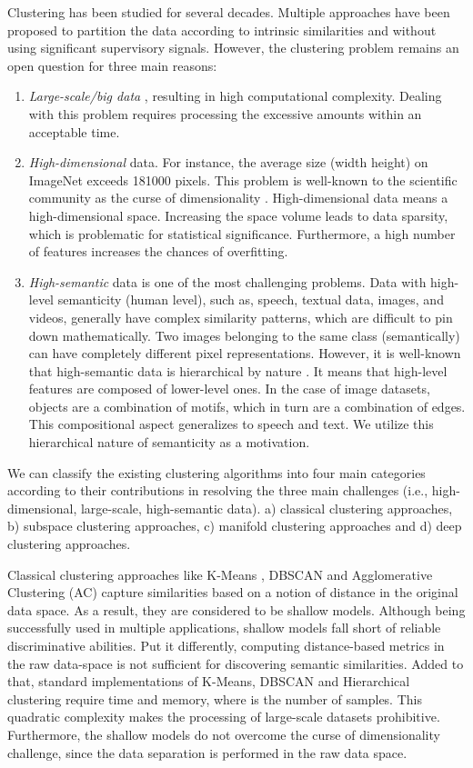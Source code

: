\documentclass{article}
\begin{document}
Clustering has been studied for several decades. Multiple approaches have been proposed to partition the data according to intrinsic similarities and without using significant supervisory signals. However, the clustering problem remains an open question for three main reasons:
\begin{enumerate}
  \item \textit{Large-scale/big data} \cite{paper57}, resulting in high computational complexity. Dealing with this problem requires processing the excessive amounts within an acceptable time. 
  \item \textit{High-dimensional} data. For instance, the average size (width  height) on ImageNet \cite{paper82} exceeds 181000 pixels. This problem is well-known to the scientific community as the curse of dimensionality \cite{paper56}. High-dimensional data means a high-dimensional space. Increasing the space volume leads to data sparsity, which is problematic for statistical significance. Furthermore, a high number of features increases the chances of overfitting.
  \item  \textit{High-semantic} data is one of the most challenging problems. Data with high-level semanticity (human level), such as, speech, textual data, images, and videos, generally have complex similarity patterns, which are difficult to pin down mathematically. Two images belonging to the same class (semantically) can have completely different pixel representations. However, it is well-known that high-semantic data is hierarchical by nature \cite{paper20}. It means that high-level features are composed of lower-level ones. In the case of image datasets, objects are a combination of motifs, which in turn are a combination of edges. This compositional aspect generalizes to speech and text. We utilize this hierarchical nature of semanticity as a motivation. 
\end{enumerate}

We can classify the existing clustering algorithms into four main categories according to their contributions in resolving the three main challenges (i.e., high-dimensional, large-scale, high-semantic data). a) classical clustering  approaches, b) subspace clustering approaches, c) manifold clustering approaches and d) deep clustering approaches.

Classical clustering approaches like K-Means \cite{paper14}, DBSCAN \cite{paper83} and Agglomerative Clustering (AC) \cite{paper84} capture similarities based on a notion of distance in the original data space. As a result, they are considered to be shallow models. Although being successfully used in multiple applications, shallow models fall short of reliable discriminative abilities. Put it differently, computing distance-based metrics in the raw data-space is not sufficient for discovering semantic similarities. Added to that, standard implementations of K-Means, DBSCAN and Hierarchical clustering require  time and  memory, where  is the number of samples. This quadratic complexity makes the processing of large-scale datasets prohibitive. Furthermore, the shallow models do not overcome the curse of dimensionality challenge, since the data separation is performed in the raw data space.
\end{document}
